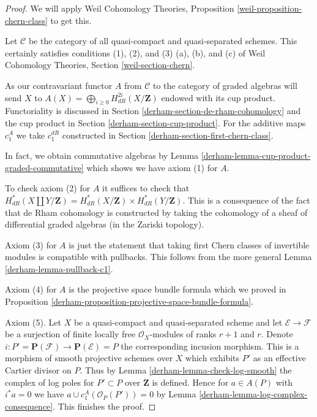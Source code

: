\begin{proof}

We will apply Weil Cohomology Theories, Proposition
\ref{weil-proposition-chern-class} to get this.

\medskip\noindent
Let $\mathcal{C}$ be the category of all quasi-compact and quasi-separated
schemes. This certainly satisfies conditions
(1), (2), and (3) (a), (b), and (c) of  Weil Cohomology Theories,
Section \ref{weil-section-chern}.

\medskip\noindent
As our contravariant functor $A$ from $\mathcal{C}$ to the
category of graded algebras will send $X$ to
$A(X) = \bigoplus_{i \geq 0} H_{dR}^{2i}(X/\mathbf{Z})$
endowed with its cup product.
Functoriality is discussed in Section \ref{derham-section-de-rham-cohomology}
and the cup product in Section \ref{derham-section-cup-product}.
For the additive maps $c_1^A$ we take $c_1^{dR}$ constructed
in Section \ref{derham-section-first-chern-class}.

\medskip\noindent
In fact, we obtain commutative algebras by
Lemma \ref{derham-lemma-cup-product-graded-commutative}
which shows we have axiom (1) for $A$.

\medskip\noindent
To check axiom (2) for $A$ it suffices to check that
$H^*_{dR}(X \coprod Y/\mathbf{Z}) =  H^*_{dR}(X/\mathbf{Z}) \times
H^*_{dR}(Y/\mathbf{Z})$.
This is a consequence of the fact that de Rham cohomology
is constructed by taking the cohomology of a sheaf of differential
graded algebras (in the Zariski topology).

\medskip\noindent
Axiom (3) for $A$ is just the statement that taking first Chern
classes of invertible modules is compatible with pullbacks.
This follows from the more general Lemma \ref{derham-lemma-pullback-c1}.

\medskip\noindent
Axiom (4) for $A$ is the projective space bundle formula which
we proved in Proposition \ref{derham-proposition-projective-space-bundle-formula}.

\medskip\noindent
Axiom (5).  Let $X$ be a quasi-compact and quasi-separated scheme and
let $\mathcal{E} \to \mathcal{F}$ be a surjection of finite locally free
$\mathcal{O}_X$-modules of ranks $r + 1$ and $r$. Denote
$i : P' = \mathbf{P}(\mathcal{F}) \to \mathbf{P}(\mathcal{E}) = P$ the
corresponding incusion morphism. This is a morphism of smooth projective
schemes over $X$ which exhibits $P'$ as an effective Cartier divisor on $P$.
Thus by Lemma \ref{derham-lemma-check-log-smooth} the complex of log poles
for $P' \subset P$ over $\mathbf{Z}$ is defined.
Hence for $a \in A(P)$ with $i^*a = 0$ we have
$a \cup c_1^A(\mathcal{O}_P(P')) = 0$ by
Lemma \ref{derham-lemma-log-complex-consequence}.
This finishes the proof.
\end{proof}

